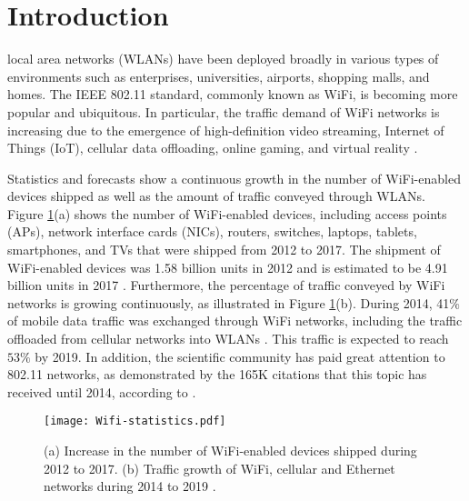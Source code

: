 %
%
%
%
%
\section{Introduction}
\label{intro}
 local area networks (WLANs) have been deployed broadly in various types of environments such as enterprises, universities, airports, shopping malls, and homes. 
The IEEE 802.11 standard, commonly known as WiFi, is becoming more popular and ubiquitous. 
In particular, the traffic demand of WiFi networks is increasing due to the emergence of high-definition video streaming, Internet of Things (IoT), cellular data offloading, online gaming, and virtual reality \cite{Tozlu2012,Baird2017,NextGen-WiFi-Survey-2016,Offloading-survey-2016,WifiAlliance1,Ericsson}.

Statistics and forecasts show a continuous growth in the number of WiFi-enabled devices shipped as well as the amount of traffic conveyed through WLANs. 
Figure \ref{wifi-statistics}(a) shows the number of WiFi-enabled devices, including access points (APs), network interface cards (NICs), routers, switches, laptops, tablets, smartphones, and TVs that were shipped from 2012 to 2017. 
The shipment of WiFi-enabled devices was 1.58 billion units in 2012 and is estimated to be 4.91 billion units in 2017 \cite{WiFi-Devices,WifiAlliance1,Ericsson}. 
Furthermore, the percentage of traffic conveyed by WiFi networks is growing continuously, as illustrated in Figure \ref{wifi-statistics}(b). 
During 2014, 41$\%$ of mobile data traffic was exchanged through WiFi networks, including the traffic offloaded from cellular networks into WLANs \cite{Cisco-statistics,Offloading,Offloading-survey-2016}. 
This traffic is expected to reach $53\%$ by 2019. 
In addition, the scientific community has paid great attention to 802.11 networks, as demonstrated by the 165K citations that this topic has received until 2014, according to \cite{Experimenting802.11}.

%
\begin{figure}[!t]
	\centering
{\texttt{[image: Wifi-statistics.pdf]}}
	\caption{(a) Increase in the number of WiFi-enabled devices shipped during 2012 to 2017. (b) Traffic growth of WiFi, cellular and Ethernet networks during 2014 to 2019 \cite{Cisco-statistics}.}
		\label{wifi-statistics}
\end{figure} 
%
%
%


